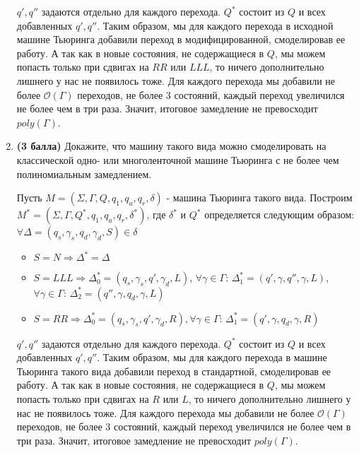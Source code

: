 \begin{enumerate}
\begin{solution}
\begin{itemize}
              \end{itemize}
              $q', q''$ задаются отдельно для каждого перехода. $Q^*$ состоит из $Q$ и всех добавленных $q', q''$. Таким образом, мы для каждого перехода в исходной машине Тьюринга добавили переход в модифицированной, смоделировав ее работу. А так как в новые состояния, не содержащиеся в $Q$, мы можем попасть только при сдвигах на $RR$ или $LLL$, то ничего дополнительно лишнего у нас не появилось тоже. Для каждого перехода мы добавили не более $\mathcal{O}(\Gamma)$ переходов, не более 3 состояний, каждый переход увеличился не более чем в три раза. Значит, итоговое замедление не превосходит $poly(\Gamma)$.
          \end{solution}
    \item \textbf{(3 балла)} Докажите, что машину такого вида можно смоделировать на классической одно- или многоленточной машине Тьюринга с не более чем полиномиальным замедлением.
          \begin{solution}
              Пусть $M = (\Sigma, \Gamma, Q, q_1, q_a, q_r, \delta)$ - машина Тьюринга такого вида. Построим $M^* = (\Sigma, \Gamma, Q^*, q_1, q_a, q_r, \delta^*)$, где $\delta^*$ и $Q^*$ определяется следующим образом: $\forall \Delta = (q_s, \gamma_s, q_d, \gamma_d, S) \in \delta$
              \begin{itemize}
                  \item $S = N \Rightarrow \Delta^* = \Delta$
                  \item $S = LLL \Rightarrow \Delta_0^* = (q_s, \gamma_s, q', \gamma_d, L)$, $\forall \gamma \in \Gamma: \, \Delta_1^* = (q', \gamma, q'', \gamma, L)$, $\forall \gamma \in \Gamma: \, \Delta_2^* = (q'', \gamma, q_d, \gamma, L)$
                  \item $S = RR \Rightarrow \Delta_0^* = (q_s, \gamma_s, q', \gamma_d, R), \forall \gamma \in \Gamma: \, \Delta_1^* = (q', \gamma, q_d, \gamma, R)$
              \end{itemize}
              $q', q''$ задаются отдельно для каждого перехода. $Q^*$ состоит из $Q$ и всех добавленных $q', q''$. Таким образом, мы для каждого перехода в машине Тьюринга такого вида добавили переход в стандартной, смоделировав ее работу. А так как в новые состояния, не содержащиеся в $Q$, мы можем попасть только при сдвигах на $R$ или $L$, то ничего дополнительно лишнего у нас не появилось тоже. Для каждого перехода мы добавили не более $\mathcal{O}(\Gamma)$ переходов, не более 3 состояний, каждый переход увеличился не более чем в три раза. Значит, итоговое замедление не превосходит $poly(\Gamma)$.
          \end{solution}
\end{enumerate}



